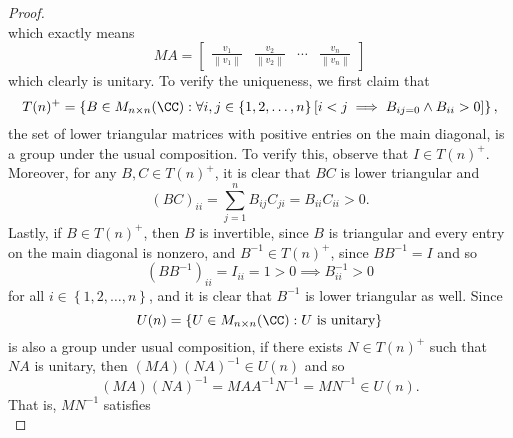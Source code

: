 \documentclass[linearalgebraII]{subfiles}
\begin{document}
\begin{proof}
\begin{equation*}
        \end{equation*}
        which exactly means
        \begin{equation*}
            MA =
            \begin{bmatrix}
                \frac{v_1}{\left\lVert v_1\right\rVert } & \frac{v_2}{\left\lVert v_2\right\rVert } & \cdots & \frac{v_n}{\left\lVert v_n\right\rVert }
            \end{bmatrix}
        \end{equation*}
        which clearly is unitary. To verify the uniqueness, we first claim that
        \begin{equation*}
            T(n)^+ = \left\lbrace B\in M_{n\times n}(\CC): \forall i,j\in\left\lbrace 1,2,\ldots,n \right\rbrace \left[ i<j\implies B_{ij=0}\land B_{ii} > 0 \right]  \right\rbrace ,
        \end{equation*}
        the set of lower triangular matrices with positive entries on the main diagonal, is a group under the usual composition. To verify this, observe that $I\in T(n)^+$. Moreover, for any $B,C\in T(n)^+$, it is clear that $BC$ is lower triangular and
        \begin{equation*}
            (BC)_{ii} = \sum^{n}_{j=1} B_{ij}C_{ji} = B_{ii}C_{ii} > 0.
        \end{equation*}
        Lastly, if $B\in T(n)^+$, then $B$ is invertible, since $B$ is triangular and every entry on the main diagonal is nonzero, and $B^{-1}\in T(n)^+$, since $BB^{-1} = I$ and so
        \begin{equation*}
            \left( BB^{-1} \right) _{ii} = I_{ii} = 1 > 0 \implies B^{-1}_{ii} > 0
        \end{equation*}
        for all $i\in\left\lbrace 1,2,\ldots,n \right\rbrace$, and it is clear that $B^{-1}$ is lower triangular as well. Since
        \begin{equation*}
            U(n) = \left\lbrace U\in M_{n\times n}(\CC): U\text{ is unitary} \right\rbrace 
        \end{equation*}
        is also a group under usual composition, if there exists $N\in T(n)^+$ such that $NA$ is unitary, then $(MA)(NA)^{-1}\in U(n)$ and so
        \begin{equation*}
            (MA)(NA)^{-1} = MAA^{-1}N^{-1} = MN^{-1} \in U(n).
        \end{equation*}
        That is, $MN^{-1}$ satisfies
        \begin{equation*}

\end{equation*}
\end{proof}
\end{document}
